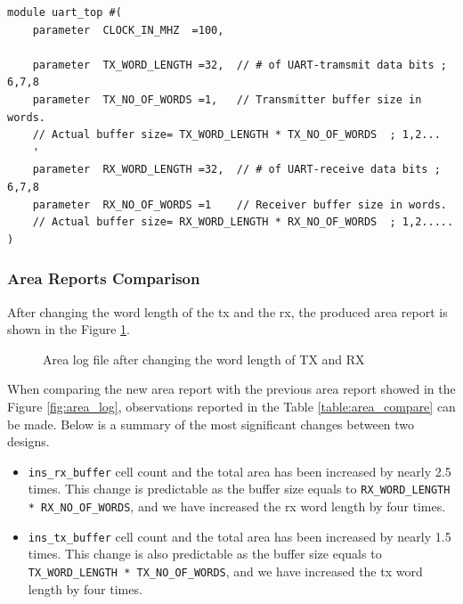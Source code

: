 \documentclass[a4paper,11pt]{article}%
\begin{document}
\begin{Verbatim}[frame=single]
module uart_top #(
    parameter  CLOCK_IN_MHZ  =100,
    
    parameter  TX_WORD_LENGTH =32,  // # of UART-tramsmit data bits ; 6,7,8
    parameter  TX_NO_OF_WORDS =1,   // Transmitter buffer size in words.
    // Actual buffer size= TX_WORD_LENGTH * TX_NO_OF_WORDS  ; 1,2...
    '
    parameter  RX_WORD_LENGTH =32,  // # of UART-receive data bits ; 6,7,8
    parameter  RX_NO_OF_WORDS =1    // Receiver buffer size in words.
    // Actual buffer size= RX_WORD_LENGTH * RX_NO_OF_WORDS  ; 1,2.....
)
\end{Verbatim}

\subsubsection{Area Reports Comparison}

After changing the word length of the \ac{tx} and the \ac{rx}, the produced area report is shown in the Figure \ref{fig:area_log2}.

\begin{figure}[h]
	\centering
	\caption{Area log file after changing the word length of TX and RX}
	\label{fig:area_log2}
\end{figure}

When comparing the new area report with the previous area report showed in the Figure \ref{fig:area_log}, observations reported in the Table \ref{table:area_compare} can be made. Below is a summary of the most significant changes between two designs.

\begin{itemize}
	\item {\tt ins\_rx\_buffer} cell count and the total area has been increased by nearly 2.5 times. This change is predictable as the buffer size equals to {\tt RX\_WORD\_LENGTH * RX\_NO\_OF\_WORDS}, and we have increased the \ac{rx} word length by four times.
	
	\item {\tt ins\_tx\_buffer} cell count and the total area has been increased by nearly 1.5 times. This change is also predictable as the buffer size equals to {\tt TX\_WORD\_LENGTH * TX\_NO\_OF\_WORDS}, and we have increased the \ac{tx} word length by four times.
\end{itemize}
\end{document}
